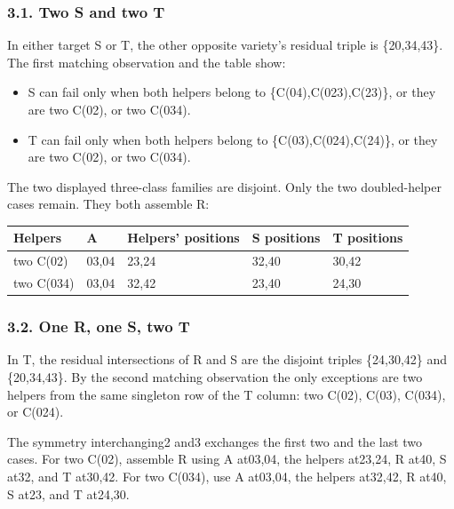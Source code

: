 \documentclass[
  10pt,
]{article}
\providecommand{\tightlist}{%
  \setlength{\itemsep}{0pt}\setlength{\parskip}{0pt}}
\begin{document}
\hypertarget{two-s-and-two-t}{%
\subsubsection*{3.1. Two S and two T}\label{two-s-and-two-t}}

In either target S or T, the other opposite variety's residual triple is
\{20,34,43\}. The first matching observation and the table show:

\begin{itemize}
\tightlist
\item
  S can fail only when both helpers belong to \{C(04),C(023),C(23)\}, or
  they are two C(02), or two C(034).
\item
  T can fail only when both helpers belong to \{C(03),C(024),C(24)\}, or
  they are two C(02), or two C(034).
\end{itemize}

The two displayed three-class families are disjoint. Only the two
doubled-helper cases remain. They both assemble R:

\begin{longtable}[]{@{}lllll@{}}
\toprule\noalign{}
Helpers & A & Helpers' positions & S positions & T positions \\
\midrule\noalign{}
\endhead
\bottomrule\noalign{}
\endlastfoot
two C(02) & 03,04 & 23,24 & 32,40 & 30,42 \\
two C(034) & 03,04 & 32,42 & 23,40 & 24,30 \\
\end{longtable}

\hypertarget{one-r-one-s-two-t}{%
\subsubsection*{3.2. One R, one S, two T}\label{one-r-one-s-two-t}}

In T, the residual intersections of R and S are the disjoint triples
\{24,30,42\} and \{20,34,43\}. By the second matching observation the
only exceptions are two helpers from the same singleton row of the T
column: two C(02), C(03), C(034), or C(024).

The symmetry interchanging2 and3 exchanges the first two and the last
two cases. For two C(02), assemble R using A at03,04, the helpers
at23,24, R at40, S at32, and T at30,42. For two C(034), use A at03,04,
the helpers at32,42, R at40, S at23, and T at24,30.
\end{document}
